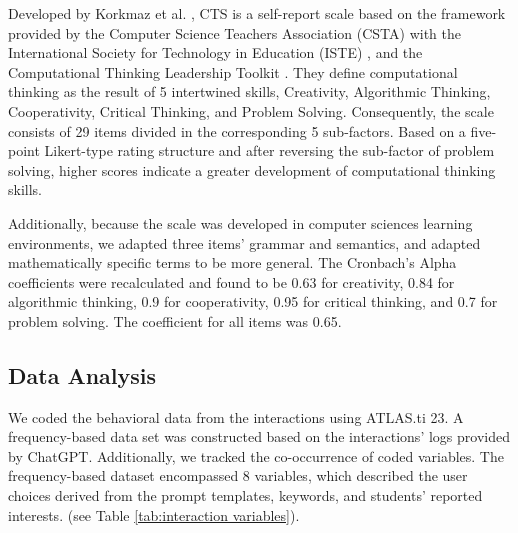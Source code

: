 \documentclass[sn-mathphys, Numbered]{sn-jnl}%
\theoremstyle{thmstyleone}%
\theoremstyle{thmstyletwo}%
\theoremstyle{thmstylethree}%
\begin{document}
Developed by Korkmaz et al. \parencite*{korkmaz_validity_2017}, CTS is a self-report scale based on the framework provided by the Computer Science Teachers Association (CSTA) with the International Society for Technology in Education (ISTE) \parencite*{csta_iste_operational_2015, iste_computational_2011}, and the Computational Thinking Leadership Toolkit \parencite{iste_ct_2015}. They define computational thinking as the result of 5 intertwined skills, Creativity, Algorithmic Thinking, Cooperativity, Critical Thinking, and Problem Solving. Consequently, the scale consists of 29 items divided in the corresponding 5 sub-factors. Based on a five-point Likert-type rating structure and after reversing the sub-factor of problem solving, higher scores indicate a greater development of computational thinking skills.

Additionally, because the scale was developed in computer sciences learning environments, we adapted three items' grammar and semantics, and adapted mathematically specific terms to be more general. The Cronbach's Alpha coefficients were recalculated and found to be 0.63 for creativity, 0.84 for algorithmic thinking, 0.9 for cooperativity, 0.95 for critical thinking, and 0.7 for problem solving. The coefficient for all items was 0.65.


\subsection*{Data Analysis}

We coded the behavioral data from the interactions using ATLAS.ti 23. A frequency-based data set was constructed based on the interactions' logs provided by ChatGPT. Additionally, we tracked the co-occurrence of coded variables. The frequency-based dataset encompassed 8 variables, which described the user choices derived from the prompt templates, keywords, and students' reported interests. (see Table \ref{tab:interaction variables}). 
\end{document}

